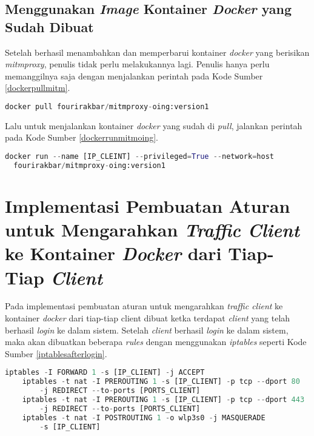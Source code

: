   \subsection{Menggunakan \textit{Image} Kontainer \textit{Docker} yang Sudah Dibuat}
  Setelah berhasil menambahkan dan memperbarui kontainer \textit{docker} yang berisikan \textit{mitmproxy}, penulis tidak perlu melakukannya lagi. Penulis hanya perlu memanggilnya saja dengan menjalankan perintah pada Kode Sumber \ref{dockerpullmitm}.
  \newline
  \begin{minipage}{\linewidth}
  \begin{lstlisting}[caption=Perintah untuk \textit{Pull Image mitmproxy},language=Python,label=dockerpullmitm]
  docker pull fourirakbar/mitmproxy-oing:version1
  \end{lstlisting}
  \end{minipage}
  Lalu untuk menjalankan kontainer \textit{docker} yang sudah di \textit{pull}, jalankan perintah pada Kode Sumber \ref{dockerrunmitmoing}.
  \newline
  \begin{minipage}{\linewidth}
  \begin{lstlisting}[caption=Perintah untuk \textit{Pull Image mitmproxy},language=Python,label=dockerrunmitmoing]
  docker run --name [IP_CLEINT] --privileged=True --network=host 
  fourirakbar/mitmproxy-oing:version1
  \end{lstlisting}
  \end{minipage}
  
\section{Implementasi Pembuatan Aturan untuk Mengarahkan \textit{Traffic Client} ke Kontainer \textit{Docker} dari Tiap-Tiap \textit{Client}}
Pada implementasi pembuatan aturan untuk mengarahkan \textit{traffic client} ke kontainer \textit{docker} dari tiap-tiap client dibuat ketka terdapat \textit{client} yang telah berhasil \textit{login} ke dalam sistem. Setelah \textit{client} berhasil \textit{login} ke dalam sistem, maka akan dibuatkan beberapa \textit{rules} dengan menggunakan \textit{iptables} seperti Kode Sumber \ref{iptablesafterlogin}. \\
\begin{minipage}{\linewidth}
	\begin{lstlisting}[caption=Command untuk mengarahkan \textit{client} ke halaman \textit{login},language=Python,label=iptablesafterlogin]
	iptables -I FORWARD 1 -s [IP_CLIENT] -j ACCEPT
	iptables -t nat -I PREROUTING 1 -s [IP_CLIENT] -p tcp --dport 80
		-j REDIRECT --to-ports [PORTS_CLIENT]
	iptables -t nat -I PREROUTING 1 -s [IP_CLIENT] -p tcp --dport 443
		-j REDIRECT --to-ports [PORTS_CLIENT]
	iptables -t nat -I POSTROUTING 1 -o wlp3s0 -j MASQUERADE 
		-s [IP_CLIENT]
\end{lstlisting}
\end{minipage}

